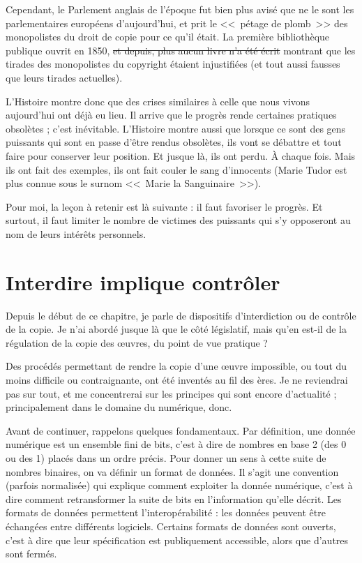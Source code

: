 Cependant, le Parlement anglais de l'époque fut bien plus avisé que ne le sont les parlementaires européens d'aujourd'hui, et prit le <<~pétage de plomb~>> des monopolistes du droit de copie pour ce qu'il était. 
La première bibliothèque publique ouvrit en 1850, \sout{et depuis, plus aucun livre n'a été écrit} montrant que les tirades des monopolistes du copyright étaient injustifiées (et tout aussi fausses que leurs tirades actuelles).

L'Histoire montre donc que des crises similaires à celle que nous vivons aujourd'hui ont déjà eu lieu.
Il arrive que le progrès rende certaines pratiques obsolètes ; c'est inévitable.
L'Histoire montre aussi que lorsque ce sont des gens puissants qui sont en passe d'être rendus obsolètes, ils vont se débattre et tout faire pour conserver leur position.
Et jusque là, ils ont perdu.
À chaque fois.
Mais ils ont fait des exemples, ils ont fait couler le sang d'innocents (Marie Tudor est plus connue sous le surnom <<~Marie la Sanguinaire~>>).

Pour moi, la leçon à retenir est là suivante : il faut favoriser le progrès.
Et surtout, il faut limiter le nombre de victimes des puissants qui s'y opposeront au nom de leurs intérêts personnels.

\section{Interdire implique contrôler} %
\label{drm}

Depuis le début de ce chapitre, je parle de dispositifs d'interdiction ou de contrôle de la copie.
Je n'ai abordé jusque là que le côté législatif, mais qu'en est-il de la régulation de la copie des œuvres, du point de vue pratique ?

Des procédés permettant de rendre la copie d'une œuvre impossible, ou tout du moins difficile ou contraignante, ont été inventés au fil des ères.
Je ne reviendrai pas sur tout, et me concentrerai sur les principes qui sont encore d'actualité ; principalement dans le domaine du numérique, donc.

Avant de continuer, rappelons quelques fondamentaux.
Par définition, une donnée numérique est un ensemble fini de bits, c'est à dire de nombres en base 2 (des 0 ou des 1) placés dans un ordre précis.
Pour donner un sens à cette suite de nombres binaires, on va définir un format de données.
Il s'agit une convention (parfois normalisée) qui explique comment exploiter la donnée numérique, c'est à dire comment retransformer la suite de bits en l'information qu'elle décrit.
Les formats de données permettent l'interopérabilité : les données peuvent être échangées entre différents logiciels.
Certains formats de données sont ouverts, c'est à dire que leur spécification est publiquement accessible, alors que d'autres sont fermés.

